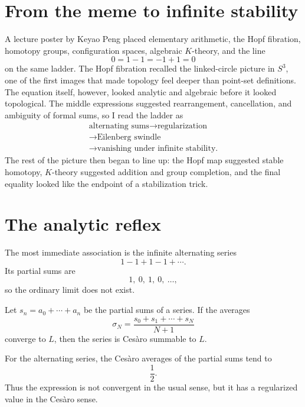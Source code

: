 
\section{From the meme to infinite stability}

A lecture poster by Keyao Peng placed elementary arithmetic, the Hopf fibration, homotopy groups, configuration spaces, algebraic \(K\)-theory, and the line
\[
  0=1-1=-1+1=0
\]
on the same ladder.  The Hopf fibration recalled the linked-circle picture in \(S^3\), one of the first images that made topology feel deeper than point-set definitions.  The equation itself, however, looked analytic and algebraic before it looked topological.  The middle expressions suggested rearrangement, cancellation, and ambiguity of formal sums, so I read the ladder as
\[
\begin{array}{c}
  \text{alternating sums}\longrightarrow\text{regularization}\\
  \longrightarrow\text{Eilenberg swindle}\\
  \longrightarrow\text{vanishing under infinite stability.}
\end{array}
\]
The rest of the picture then began to line up: the Hopf map suggested stable homotopy, \(K\)-theory suggested addition and group completion, and the final equality looked like the endpoint of a stabilization trick.

\section{The analytic reflex}

The most immediate association is the infinite alternating series
\[
  1-1+1-1+\cdots.
\]
Its partial sums are
\[
  1,\ 0,\ 1,\ 0,\ \ldots,
\]
so the ordinary limit does not exist.

\begin{definition}
Let \(s_n=a_0+\cdots+a_n\) be the partial sums of a series.  If the averages
\[
  \sigma_N=\frac{s_0+s_1+\cdots+s_N}{N+1}
\]
converge to \(L\), then the series is Ces\`aro summable to \(L\).
\end{definition}

For the alternating series, the Ces\`aro averages of the partial sums tend to
\[
  \frac12.
\]
Thus the expression is not convergent in the usual sense, but it has a regularized value in the Ces\`aro sense.

